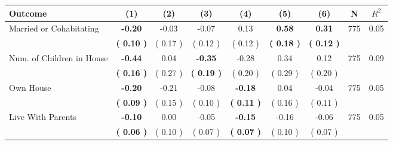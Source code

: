 \begin{tabular}{lcccccccc}
\toprule
 \textbf{Outcome} & \textbf{(1)} & \textbf{(2)} & \textbf{(3)} & \textbf{(4)} & \textbf{(5)} & \textbf{(6)} & \textbf{N} & \textbf{$ R^2$} \\
\midrule
Married or Cohabitating & \textbf{    -0.20} &     -0.03 &     -0.07 &      0.13 & \textbf{     0.58} & \textbf{     0.31} & 775 &       0.05 \\ 
 & \textbf{(     0.10 )} & (     0.17 ) & (     0.12 ) & (     0.12 ) & \textbf{(     0.18 )} & \textbf{(     0.12 )} & \\
Num. of Children in House & \textbf{    -0.44} &      0.04 & \textbf{    -0.35} &     -0.28 &      0.34 &      0.12 & 775 &       0.09 \\ 
 & \textbf{(     0.16 )} & (     0.27 ) & \textbf{(     0.19 )} & (     0.20 ) & (     0.29 ) & (     0.20 ) & \\
Own House & \textbf{    -0.20} &     -0.21 &     -0.08 & \textbf{    -0.18} &      0.04 &     -0.04 & 775 &       0.05 \\ 
 & \textbf{(     0.09 )} & (     0.15 ) & (     0.10 ) & \textbf{(     0.11 )} & (     0.16 ) & (     0.11 ) & \\
Live With Parents & \textbf{    -0.10} &      0.00 &     -0.05 & \textbf{    -0.15} &     -0.16 &     -0.06 & 775 &       0.05 \\ 
 & \textbf{(     0.06 )} & (     0.10 ) & (     0.07 ) & \textbf{(     0.07 )} & (     0.10 ) & (     0.07 ) & \\
\bottomrule
\end{tabular}
